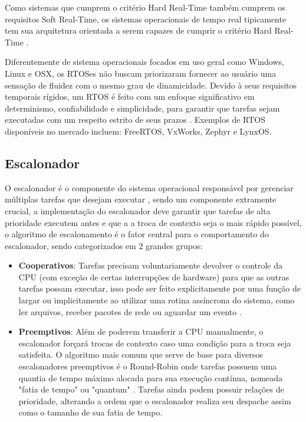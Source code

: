 Como sistemas que cumprem o critério Hard Real-Time também cumprem os requisitos Soft Real-Time, os sistemas operacionais de tempo real tipicamente tem sua arquitetura orientada a serem capazes de cumprir o critério Hard Real-Time \cite{SchedAndOptOfDistributedFT}.

Diferentemente de sistema operacionais focados em uso geral como Windows, Linux e OSX, os RTOSes não buscam priorizaram fornecer ao usuário uma sensação de fluidez com o mesmo grau de dinamicidade. Devido à seus requisitos temporais rígidos, um RTOS é feito com um enfoque significativo em determinismo, confiabilidade e simplicidade, para garantir que tarefas sejam executadas com um respeito estrito de seus prazos \cite{OperatingSystemConcepts}. Exemplos de RTOS disponíveis no mercado incluem: FreeRTOS, VxWorks, Zephyr e LynxOS.

\subsection{Escalonador}

O escalonador é o componente do sistema operacional responsável por gerenciar múltiplas tarefas que desejam executar \cite{OperatingSystemConcepts}, sendo um componente extramente crucial, a implementação do escalonador deve garantir que tarefas de alta prioridade executem antes e que a a troca de contexto seja o mais rápido possível, o algoritmo de escalonamento é o fator central para o comportamento do escalonador, sendo categorizados em 2 grandes grupos:

\begin{itemize}
    \item \textbf{Cooperativos}: Tarefas precisam voluntariamente devolver o controle da CPU (com exceção de certas interrupções de hardware) para que as outras tarefas possam executar, isso pode ser feito explicitamente por uma função de largar ou implicitamente ao utilizar uma rotina assíncrona do sistema, como ler arquivos, receber pacotes de rede ou aguardar um evento \cite{OperatingSystemConcepts}.

    \item \textbf{Preemptivos}: Além de poderem transferir a CPU manualmente, o escalonador forçará trocas de contexto caso uma condição para a troca seja satisfeita. O algoritmo mais comum que serve de base para diversos escalonadores preemptivos é o Round-Robin onde tarefas possuem uma quantia de tempo máximo alocada para sua execução contínua, nomeada "fatia de tempo" ou "quantum" \cite{ModernOperatingSystems}. Tarefas ainda podem possuir relações de prioridade, alterando a ordem que o escalonador realiza seu despache assim como o tamanho de sua fatia de tempo.
\end{itemize}

